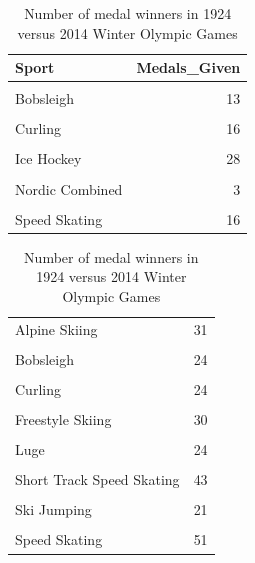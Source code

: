 \documentclass[
]{article}
\begin{document}
\begin{table}
\centering\caption{\label{tab:WinterWinners}Number of medal winners in 1924 versus 2014 Winter Olympic Games}

\centering
\begin{tabular}[t]{lr}
\toprule
Sport & \vphantom{1} Medals\_Given\\
\midrule
\cellcolor{gray!10}{Alpinism} & \cellcolor{gray!10}{21}\\
Bobsleigh & 13\\
\cellcolor{gray!10}{Cross Country Skiing} & \cellcolor{gray!10}{6}\\
Curling & 16\\
\cellcolor{gray!10}{Figure Skating} & \cellcolor{gray!10}{12}\\
\addlinespace
Ice Hockey & 28\\
\cellcolor{gray!10}{Military Ski Patrol} & \cellcolor{gray!10}{12}\\
Nordic Combined & 3\\
\cellcolor{gray!10}{Ski Jumping} & \cellcolor{gray!10}{3}\\
Speed Skating & 16\\
\bottomrule
\end{tabular}
\centering
\begin{tabular}[t]{lr}
\toprule
\cellcolor{gray!10}{Sport} & \cellcolor{gray!10}{Medals\_Given}\\
\midrule
Alpine Skiing & 31\\
\cellcolor{gray!10}{Biathlon} & \cellcolor{gray!10}{60}\\
Bobsleigh & 24\\
\cellcolor{gray!10}{Cross Country Skiing} & \cellcolor{gray!10}{60}\\
Curling & 24\\
\addlinespace
\cellcolor{gray!10}{Figure Skating} & \cellcolor{gray!10}{45}\\
Freestyle Skiing & 30\\
\cellcolor{gray!10}{Ice Hockey} & \cellcolor{gray!10}{130}\\
Luge & 24\\
\cellcolor{gray!10}{Nordic Combined} & \cellcolor{gray!10}{18}\\
\addlinespace
Short Track Speed Skating & 43\\
\cellcolor{gray!10}{Skeleton} & \cellcolor{gray!10}{6}\\
Ski Jumping & 21\\
\cellcolor{gray!10}{Snowboarding} & \cellcolor{gray!10}{30}\\
Speed Skating & 51\\
\bottomrule
\end{tabular}
\end{table}
\end{document}
